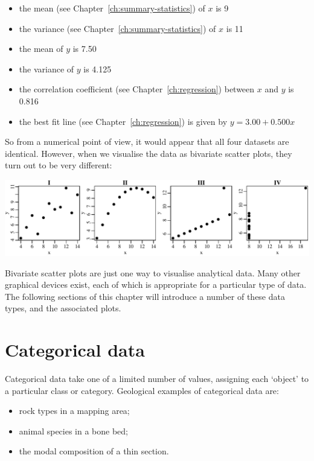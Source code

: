 \begin{itemize}\label{pg:anscombe}
\item the mean (see Chapter~\ref{ch:summary-statistics}) of $x$ is 9
\item the variance (see Chapter~\ref{ch:summary-statistics}) of $x$ is 11
\item the mean of $y$ is 7.50
\item the variance of $y$ is 4.125
\item the correlation coefficient (see Chapter~\ref{ch:regression})
  between $x$ and $y$ is 0.816
\item the best fit line (see Chapter~\ref{ch:regression}) is given by $y =
  3.00 + 0.500 x$
\end{itemize}

So from a numerical point of view, it would appear that all four
datasets are identical. However, when we visualise the data as
bivariate scatter plots, they turn out to be very different:\medskip

\noindent\includegraphics[width=\textwidth]{../figures/anscombe.pdf}
\begingroup
{}\label{fig:anscombe}
\endgroup

Bivariate scatter plots are just one way to visualise analytical data.
Many other graphical devices exist, each of which is appropriate for a
particular type of data. The following sections of this chapter will
introduce a number of these data types, and the associated plots.

\section{Categorical data}
\label{sec:categorical}

Categorical data take one of a limited number of values, assigning
each `object' to a particular class or category. Geological examples
of categorical data are:

\begin{itemize}
\item rock types in a mapping area;
\item animal species in a bone bed;
\item the modal composition of a thin section.
\end{itemize}

